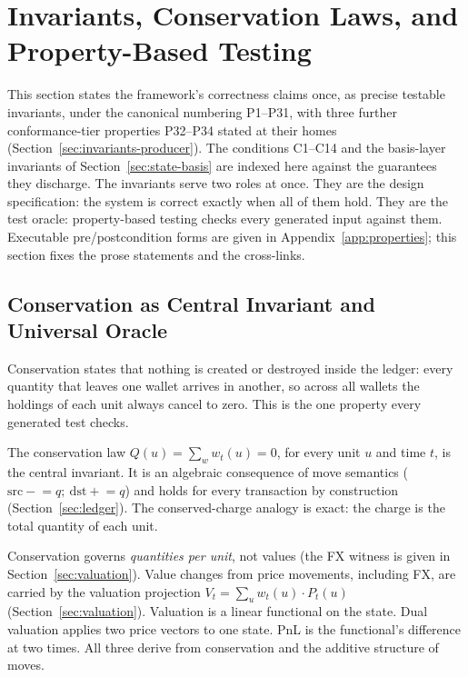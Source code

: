 \section{Invariants, Conservation Laws, and Property-Based Testing}
\label{sec:invariants}

This section states the framework's correctness claims once, as precise testable invariants, under the canonical numbering P1--P31, with three further conformance-tier properties P32--P34 stated at their homes (Section~\ref{sec:invariants-producer}). The conditions C1--C14 and the basis-layer invariants of Section~\ref{sec:state-basis} are indexed here against the guarantees they discharge. The invariants serve two roles at once. They are the design specification: the system is correct exactly when all of them hold. They are the test oracle: property-based testing checks every generated input against them. Executable pre/postcondition forms are given in Appendix~\ref{app:properties}; this section fixes the prose statements and the cross-links.

\subsection{Conservation as Central Invariant and Universal Oracle}
\label{sec:invariants-conservation}

Conservation states that nothing is created or destroyed inside the ledger: every quantity that leaves one wallet arrives in another, so across all wallets the holdings of each unit always cancel to zero. This is the one property every generated test checks.

The conservation law $Q(u)=\sum_w w_t(u)=0$, for every unit $u$ and time $t$, is the central invariant. It is an algebraic consequence of move semantics ($\mathrm{src}\mathrel{-}=q;\ \mathrm{dst}\mathrel{+}=q$) and holds for every transaction by construction (Section~\ref{sec:ledger}). The conserved-charge analogy is exact: the charge is the total quantity of each unit.

Conservation governs \emph{quantities per unit}, not values (the FX witness is given in Section~\ref{sec:valuation}). Value changes from price movements, including FX, are carried by the valuation projection $V_t=\sum_u w_t(u)\cdot P_t(u)$ (Section~\ref{sec:valuation}). Valuation is a linear functional on the state. Dual valuation applies two price vectors to one state. PnL is the functional's difference at two times. All three derive from conservation and the additive structure of moves.

